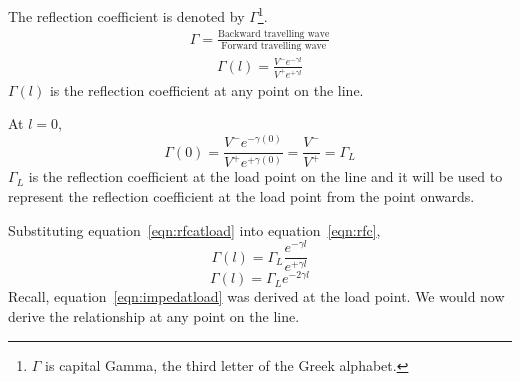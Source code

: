 The reflection coefficient is denoted by $\Gamma$\footnote{
$\Gamma$ is capital Gamma, the third letter of the Greek alphabet.
}.
\begin{align*}
\Gamma = \frac{\text{Backward travelling wave}}{\text{Forward travelling wave}}
\end{align*}
\begin{align}
\Gamma(l) = \frac{V^-e^{-\gamma l}}{V^+e^{+\gamma l}}
\label{eqn:rfc}
\end{align}
$\Gamma(l)$ is the reflection coefficient at any point on the line.

At $l = 0$,
\begin{dmath}
\Gamma (0) = \frac{V^-e^{-\gamma (0)}}{V^+e^{+\gamma (0)}}
= \frac{V^-}{V^+}
= \Gamma_L
\label{eqn:rfcatload}
\end{dmath}
$\Gamma_L$ is the reflection coefficient at the load point on the line and it will be used to represent the reflection coefficient at the load point from the point onwards.

Substituting equation~\eqref{eqn:rfcatload} into equation~\eqref{eqn:rfc},
\begin{equation*}
\Gamma (l) = \Gamma_L\frac{e^{-\gamma l}}{e^{+\gamma l}}
\end{equation*}
\begin{equation}
\Gamma (l) = \Gamma_L e^{-2\gamma l}
\label{eqn:rfc2}
\end{equation}
Recall, equation~\ref{eqn:impedatload} was derived at the load point. We would now derive the relationship at any point on the line.

